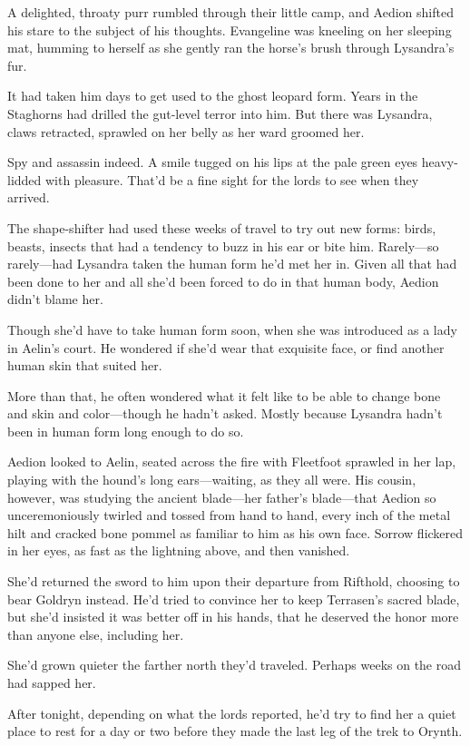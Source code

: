 A delighted, throaty purr rumbled through their little camp, and Aedion shifted his stare to the subject of his thoughts.
Evangeline was kneeling on her sleeping mat, humming to herself as she gently ran the horse's brush through Lysandra's fur.

It had taken him days to get used to the ghost leopard form.
Years in the Staghorns had drilled the gut-level terror into him.
But there was Lysandra, claws retracted, sprawled on her belly as her ward groomed her.

Spy and assassin indeed.
A smile tugged on his lips at the pale green eyes heavy-lidded with pleasure.
That'd be a fine sight for the lords to see when they arrived.

The shape-shifter had used these weeks of travel to try out new forms:
birds, beasts, insects that had a tendency to buzz in his ear or bite him.
Rarely---so rarely---had Lysandra taken the human form he'd met her in.
Given all that had been done to her and all she'd been forced to do in that human body, Aedion didn't blame her.

Though she'd have to take human form soon, when she was introduced as a lady in Aelin's court.
He wondered if she'd wear that exquisite face, or find another human skin that suited her.

More than that, he often wondered what it felt like to be able to change bone and skin and color---though he hadn't asked.
Mostly because Lysandra hadn't been in human form long enough to do so.

Aedion looked to Aelin, seated across the fire with Fleetfoot sprawled in her lap, playing with the hound's long ears---waiting, as they all were.
His cousin, however, was studying the ancient blade---her father's blade---that Aedion so unceremoniously twirled and tossed from hand to hand, every inch of the metal hilt and cracked bone pommel as familiar to him as his own face.
Sorrow flickered in her eyes, as fast as the lightning above, and then vanished.

She'd returned the sword to him upon their departure from Rifthold, choosing to bear Goldryn instead.
He'd tried to convince her to keep Terrasen's sacred blade, but she'd insisted it was better off in his hands, that he deserved the honor more than anyone else, including her.

She'd grown quieter the farther north they'd traveled.
Perhaps weeks on the road had sapped her.

After tonight, depending on what the lords reported, he'd try to find her a quiet place to rest for a day or two before they made the last leg of the trek to Orynth.

